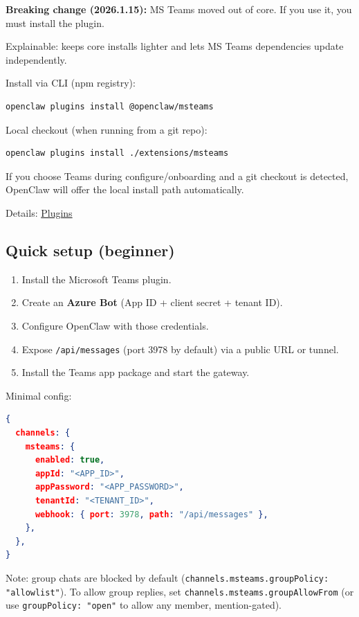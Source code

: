 \textbf{Breaking change (2026.1.15):} MS Teams moved out of core. If you use it, you must install the plugin.

Explainable: keeps core installs lighter and lets MS Teams dependencies update independently.

Install via CLI (npm registry):

\begin{lstlisting}[language=bash]
openclaw plugins install @openclaw/msteams
\end{lstlisting}


Local checkout (when running from a git repo):

\begin{lstlisting}[language=bash]
openclaw plugins install ./extensions/msteams
\end{lstlisting}


If you choose Teams during configure/onboarding and a git checkout is detected,
OpenClaw will offer the local install path automatically.

Details: \href{/tools/plugin}{Plugins}

\subsection{Quick setup (beginner)}


\begin{enumerate}
  \item Install the Microsoft Teams plugin.
  \item Create an \textbf{Azure Bot} (App ID + client secret + tenant ID).
  \item Configure OpenClaw with those credentials.
  \item Expose \texttt{/api/messages} (port 3978 by default) via a public URL or tunnel.
  \item Install the Teams app package and start the gateway.
\end{enumerate}


Minimal config:

\begin{lstlisting}[language=json]
{
  channels: {
    msteams: {
      enabled: true,
      appId: "<APP_ID>",
      appPassword: "<APP_PASSWORD>",
      tenantId: "<TENANT_ID>",
      webhook: { port: 3978, path: "/api/messages" },
    },
  },
}
\end{lstlisting}


Note: group chats are blocked by default (\texttt{channels.msteams.groupPolicy: "allowlist"}). To allow group replies, set \texttt{channels.msteams.groupAllowFrom} (or use \texttt{groupPolicy: "open"} to allow any member, mention-gated).

